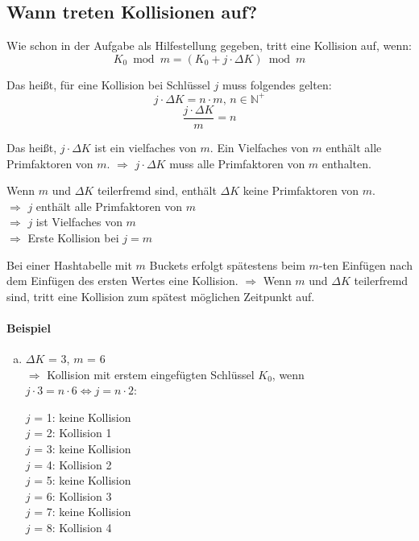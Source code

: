 \begin{solution}
\subsection{\color{solutioncolor}Wann treten Kollisionen auf?}

Wie schon in der Aufgabe als Hilfestellung gegeben, tritt eine Kollision auf, wenn:
\[K_{0} \bmod m = (K_{0} + j \cdot \Delta K) \bmod m\]

Das heißt, für eine Kollision bei Schlüssel $j$ muss folgendes gelten:
\[j \cdot \Delta K = n \cdot m,\, n \in \mathbb{N}^+ \]
\[\frac{j \cdot \Delta K}{m} = n\]

Das heißt, $j \cdot \Delta K$ ist ein vielfaches von $m$. Ein Vielfaches von $m$ enthält alle Primfaktoren von $m$. $\Rightarrow$ $j \cdot \Delta K$ muss alle Primfaktoren von $m$ enthalten.

Wenn $m$ und $\Delta K$ teilerfremd sind, enthält $\Delta K$ keine Primfaktoren von $m$. \\ $\Rightarrow$ $j$ enthält alle Primfaktoren von $m$ \\
$\Rightarrow$ $j$ ist Vielfaches von $m$ \\
$\Rightarrow$ Erste Kollision bei $j = m$

Bei einer Hashtabelle mit $m$ Buckets erfolgt spätestens beim $m$-ten Einfügen nach dem Einfügen des ersten Wertes eine Kollision. $\Rightarrow$ Wenn $m$ und $\Delta K$ teilerfremd sind, tritt eine Kollision zum spätest möglichen Zeitpunkt auf.


\paragraph{\color{solutioncolor}Beispiel}

\begin{enumerate}[a)]
	\item $\Delta K$ = 3, $m$ = 6 \\
	$\Rightarrow$ Kollision mit erstem eingefügten Schlüssel $K_0$, wenn $j \cdot 3 = n \cdot 6 \Leftrightarrow j = n \cdot 2$:

	$j$ = 1: keine Kollision \\
	$j$ = 2: Kollision 1 \\
	$j$ = 3: keine Kollision \\
	$j$ = 4: Kollision 2 \\
	$j$ = 5: keine Kollision \\
	$j$ = 6: Kollision 3 \\
	$j$ = 7: keine Kollision \\
	$j$ = 8: Kollision 4 \\


\end{enumerate}
\end{solution}
